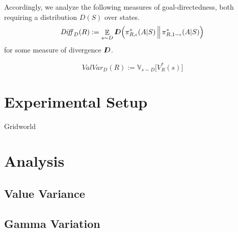 \documentclass{article}
\DeclareMathOperator*{\Ex}{\mathbb E}
\newcommand{\thickD}{I\mkern-8muD}
\begin{document}
    Accordingly, we analyze the following measures of goal-directedness, both requiring a distribution $D(S)$ over states.
    \begin{equation}
        \mathit{Diff}_D(R) := \Ex_{s \sim D} \thickD\Big( \pi^*_{R, \epsilon}(A|S) \,\Big\Vert\, \pi^*_{R,1-\epsilon}(A|S) \Big)
    \end{equation}
    for some measure of divergence $\thickD$.

    \begin{equation}
        \mathit{ValVar}_D(R) := \mathbb V_{s \sim D} \Big[ V^*_R(s) \Big]
    \end{equation}


    \section{Experimental Setup}

    Gridworld

    \section{Analysis}
    \subsection{Value Variance}
    \subsection{Gamma Variation}
\end{document}
